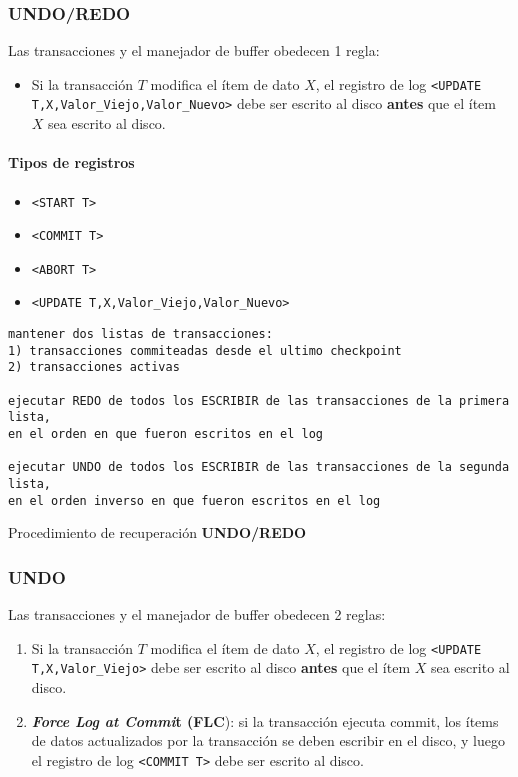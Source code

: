 \documentclass[a4paper, twoside]{article}
\begin{document}
\subsubsection{UNDO/REDO}
Las transacciones y el manejador de buffer obedecen 1 regla:
\begin{itemize}
	\item Si la transacción $T$ modifica el ítem de dato $X$, el registro de log \texttt{<UPDATE T,X,Valor\_Viejo,Valor\_Nuevo>} debe ser escrito al disco \textbf{antes} que el ítem $X$ sea escrito al disco.
\end{itemize}

\paragraph{Tipos de registros}
\begin{itemize}
	\item \texttt{<START T>}
	\item \texttt{<COMMIT T>}
	\item \texttt{<ABORT T>}
	\item \texttt{<UPDATE T,X,Valor\_Viejo,Valor\_Nuevo>}
\end{itemize}
				
\begin{algorithm}[H]
	\begin{lstlisting}
mantener dos listas de transacciones:
1) transacciones commiteadas desde el ultimo checkpoint
2) transacciones activas

ejecutar REDO de todos los ESCRIBIR de las transacciones de la primera lista, 
en el orden en que fueron escritos en el log

ejecutar UNDO de todos los ESCRIBIR de las transacciones de la segunda lista, 
en el orden inverso en que fueron escritos en el log
	\end{lstlisting}
	\caption{Procedimiento de recuperación \textbf{UNDO/REDO}}
\end{algorithm}

\subsubsection{UNDO}
Las transacciones y el manejador de buffer obedecen 2 reglas:
\begin{enumerate}
	\item Si la transacción $T$ modifica el ítem de dato $X$, el registro de log \texttt{<UPDATE T,X,Valor\_Viejo>} debe ser escrito al disco \textbf{antes} que el ítem $X$ sea escrito al disco.
	\item \textbf{\emph{Force Log at Commi}}\textbf{t (FLC}): si la transacción ejecuta commit, los ítems de datos actualizados por la transacción se deben escribir en el disco, y luego el registro de log \texttt{<COMMIT T>} debe ser escrito al disco.
\end{enumerate}
\end{document}
